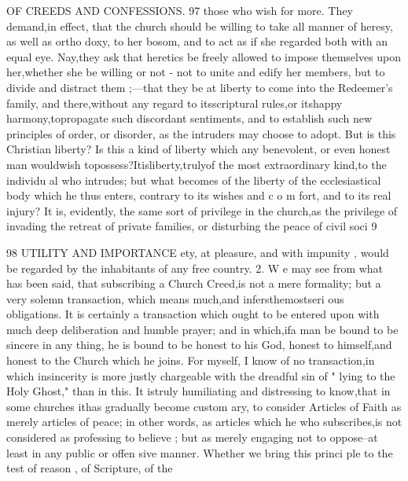 \documentclass[
]{book}
\begin{document}
OF CREEDS AND CONFESSIONS. 97
those who wish for more. They demand,in effect, that the church should be willing to
take all manner of heresy, as well as ortho doxy, to her bosom, and to act as if she
regarded both with an equal eye. Nay,they ask that heretics be freely allowed to impose
themselves upon her,whether she be willing or not - not to unite and edify her members, but to divide and distract them ;---that they be
at liberty to come into the Redeemer's family, and there,without any regard to itsscriptural
rules,or itshappy harmony,topropagate such discordant sentiments, and to establish such new principles of order, or disorder, as the intruders may choose to adopt. But is this Christian liberty? Is this a kind of liberty which any benevolent, or even honest man wouldwish topossess?Itisliberty,trulyof the most extraordinary kind,to the individu al who intrudes; but what becomes of the liberty of the ecclesiastical body which he thus enters, contrary to its wishes and c o m fort, and to its real injury? It is, evidently, the same sort of privilege in the church,as the privilege of invading the retreat of private families, or disturbing the peace of civil soci
9

98 UTILITY AND IMPORTANCE
ety, at pleasure, and with impunity , would be regarded by the inhabitants of any free country.
2. W e may see from what has been said, that subscribing a Church Creed,is not a mere formality; but a very solemn transaction, which means much,and infersthemostseri ous obligations. It is certainly a transaction which ought to be entered upon with much deep deliberation and humble prayer; and in which,ifa man be bound to be sincere in any
thing, he is bound to be honest to his God, honest to himself,and honest to the Church
which he joins. For myself, I know of no transaction,in which insincerity is more justly
chargeable with the dreadful sin of " lying to the Holy Ghost," than in this. It istruly
humiliating and distressing to know,that in some churches ithas gradually become custom ary, to consider Articles of Faith as merely articles of peace; in other words, as articles which he who subscribes,is not considered as professing to believe ; but as merely engaging not to oppose--at least in any public or offen sive manner. Whether we bring this princi
ple to the test of reason , of Scripture, of the
\end{document}
